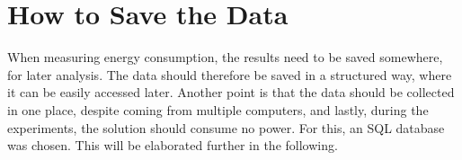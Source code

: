 \section{How to Save the Data}\label{sec:save_data}

When measuring energy consumption, the results need to be saved somewhere, for later analysis. The data should therefore be saved in a structured way, where it can be easily accessed later. Another point is that the data should be collected in one place, despite coming from multiple computers, and lastly, during the experiments, the solution should consume no power. For this, an SQL database was chosen. This will be elaborated further in the following.

